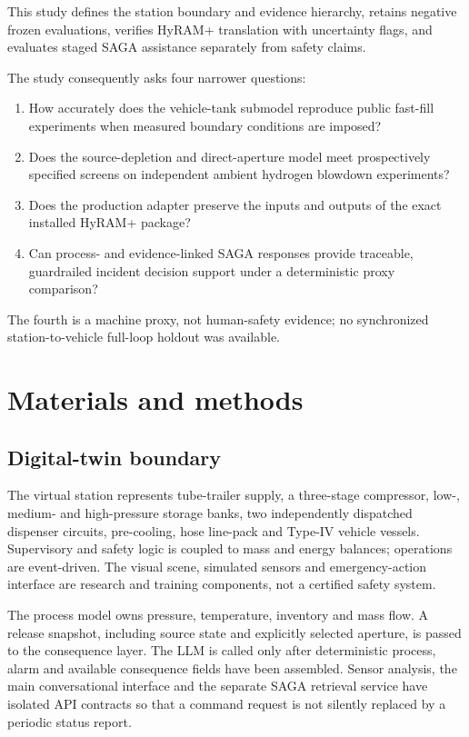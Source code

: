 \documentclass[12pt,a4paper]{article}
\begin{document}
This study defines the station boundary and evidence hierarchy, retains negative
frozen evaluations, verifies HyRAM+ translation with uncertainty flags, and
evaluates staged SAGA assistance separately from safety claims.

The study consequently asks four narrower questions:
\begin{enumerate}
  \item How accurately does the vehicle-tank submodel reproduce public fast-fill
  experiments when measured boundary conditions are imposed?
  \item Does the source-depletion and direct-aperture model meet prospectively
  specified screens on independent ambient hydrogen blowdown experiments?
  \item Does the production adapter preserve the inputs and outputs of the exact
  installed HyRAM+ package?
  \item Can process- and evidence-linked SAGA responses provide traceable, guardrailed incident
  decision support under a deterministic proxy comparison?
\end{enumerate}
The fourth is a machine proxy, not human-safety evidence; no synchronized
station-to-vehicle full-loop holdout was available.

\section{Materials and methods}
\subsection{Digital-twin boundary}
The virtual station represents tube-trailer supply, a three-stage compressor,
low-, medium- and high-pressure storage banks, two independently dispatched
dispenser circuits, pre-cooling, hose line-pack and Type-IV vehicle vessels.
Supervisory and safety logic is coupled to mass and energy balances; operations
are event-driven. The visual scene, simulated sensors and emergency-action
interface are research and training components, not a certified safety system.

The process model owns pressure, temperature, inventory and mass flow. A release
snapshot, including source state and explicitly selected aperture, is passed to
the consequence layer. The LLM is called only after deterministic process,
alarm and available consequence fields have been assembled. Sensor analysis,
the main conversational interface and the separate SAGA retrieval service have
isolated API contracts so that a command request is not silently replaced by a
periodic status report.
\end{document}
